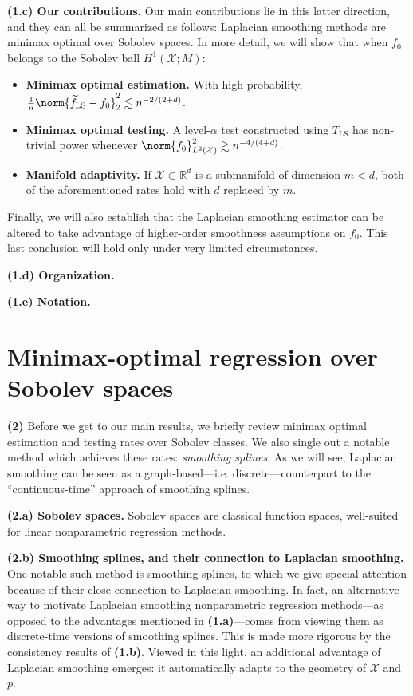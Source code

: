 \documentclass{article}
\newcommand{\Reals}{\mathbb{R}}
\newcommand{\1}{\mathbf{1}}
\newcommand{\Rd}{\Reals^d}
\newcommand{\Xset}{\mathcal{X}}
\newcommand{\Leb}{L}
\newcommand{\mc}[1]{\mathcal{#1}}
\newcommand{\wt}[1]{\widetilde{#1}}
\newcommand{\LS}{\mathrm{LS}}
\theoremstyle{alden}
\theoremstyle{aldenthm}
\theoremstyle{definition}
\theoremstyle{remark}
\begin{document}
\textbf{(1.c) Our contributions.} Our main contributions lie in this latter direction, and they can all be summarized as follows: Laplacian smoothing methods are minimax optimal over Sobolev spaces. In more detail, we will show that when $f_0$ belongs to the Sobolev ball $H^1(\Xset;M)$:
\begin{itemize}
	\item \textbf{Minimax optimal estimation.} With high probability, $\frac{1}{n}\norm{\wt{f}_{\LS} - f_0}_{2}^2 \lesssim n^{-2/(2 + d)}$.
	\item \textbf{Minimax optimal testing.}
	A level-$\alpha$ test constructed using $T_{\LS}$ has non-trivial power whenever $\norm{f_0}_{\Leb^2(\Xset)}^2 \gtrsim n^{-4/(4 + d)}$. 
	\item \textbf{Manifold adaptivity.}
	If $\mc{X} \subset \Rd$ is a submanifold of dimension $m < d$, both of the aforementioned rates hold with $d$ replaced by $m$.
\end{itemize}
Finally, we will also establish that the Laplacian smoothing estimator can be altered to take advantage of higher-order smoothness assumptions on $f_0$. This last conclusion will hold only under very limited circumstances.

\textbf{(1.d) Organization.}

\textbf{(1.e) Notation.}

\section{Minimax-optimal regression over Sobolev spaces}

\textbf{(2)} Before we get to our main results, we briefly review minimax optimal estimation and testing rates over Sobolev classes. We also single out a notable method which achieves these rates: \emph{smoothing splines}. As we will see, Laplacian smoothing can be seen as a graph-based---i.e. discrete---counterpart to the ``continuous-time'' approach of smoothing splines. 

\textbf{(2.a) Sobolev spaces.} Sobolev spaces are classical function spaces, well-suited for linear nonparametric regression methods. 

\textbf{(2.b) Smoothing splines, and their connection to Laplacian smoothing.} One notable such method is smoothing splines, to which we give special attention because of their close connection to Laplacian smoothing. In fact, an alternative way to motivate Laplacian smoothing nonparametric regression methods---as opposed to the advantages mentioned in \textbf{(1.a)}---comes from viewing them as discrete-time versions of smoothing splines. This is made more rigorous by the consistency results of \textbf{(1.b)}. Viewed in this light, an additional advantage of Laplacian smoothing emerges: it automatically adapts to the geometry of $\Xset$ and $p$.
\end{document}
